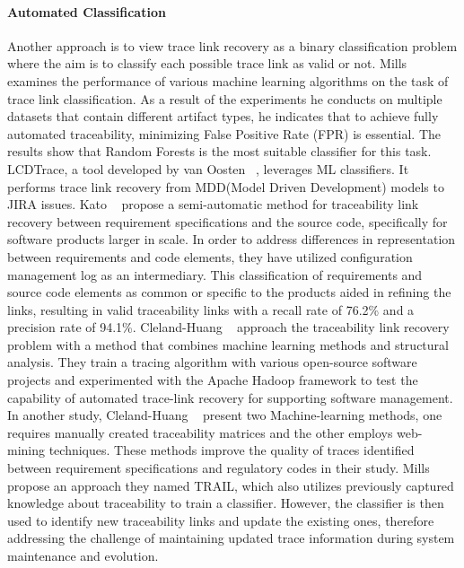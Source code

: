\paragraph{Automated Classification} Another approach is to view trace link recovery as a binary classification problem where the aim is to classify each possible trace link as valid or not. Mills~\cite{mills-2017} examines the performance of various machine learning algorithms on the task of trace link classification. As a result of the experiments he conducts on multiple datasets that contain different artifact types, he indicates that to achieve fully automated traceability, minimizing False Positive Rate (FPR) is essential. The results show that Random Forests is the most suitable classifier for this task.
LCDTrace, a tool developed by van Oosten \etal{}~\cite{VANOOSTEN2023107226}, leverages ML classifiers. It performs trace link recovery from MDD(Model Driven Development) models to JIRA issues.
Kato \etal{}~\cite{kato-2013} propose a semi-automatic method for traceability link recovery between requirement specifications and the source code, specifically for software products larger in scale. In order to address differences in representation between requirements and code elements, they have utilized configuration management log as an intermediary. This classification of requirements and source code elements as common or specific to the products aided in refining the links, resulting in valid traceability links with a recall rate of 76.2\% and a precision rate of 94.1\%. 
Cleland-Huang \etal{}~\cite{jane-2012} approach the traceability link recovery problem with a method that combines machine learning methods and structural analysis. They train a tracing algorithm with various open-source software projects and experimented with the Apache Hadoop framework to test the capability of automated trace-link recovery for supporting software management.
In another study, Cleland-Huang \etal{}~\cite{cleland-2010} present two Machine-learning methods, one requires manually created traceability matrices and the other employs web-mining techniques. These methods improve the quality of traces identified between requirement specifications and regulatory codes in their study.
Mills \etal{}~\cite{mills-2018} propose an approach they named TRAIL, which also utilizes previously captured knowledge about traceability to train a classifier. However, the classifier is then used to identify new traceability links and update the existing ones, therefore addressing the challenge of maintaining updated trace information during system maintenance and evolution.

